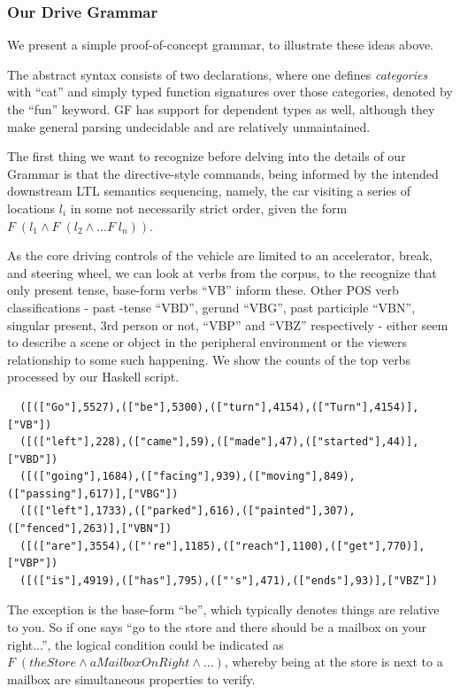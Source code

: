 \documentclass{article}
\begin{document}
\subsubsection{Our Drive Grammar}

We present a simple proof-of-concept grammar, to illustrate these ideas above.

The abstract syntax consists of two declarations, where one defines
\emph{categories} with ``cat'' and simply typed function signatures over those
categories, denoted by the ``fun'' keyword. GF has support for dependent types
as well, although they make general parsing undecidable and are relatively
unmaintained.

The first thing we want to recognize before delving into the details of our
Grammar is that the directive-style commands, being informed by the intended
downstream LTL semantics sequencing, namely, the car visiting a series of
locations $l_i$ in some not necessarily strict order, given the form $F\; (l_1
\wedge F\; (l_{2} \wedge ... F\; l_{n}))$.

As the core driving controls of the vehicle are limited to an accelerator,
break, and steering wheel, we can look at verbs from the corpus, to the
recognize that only present tense, base-form verbs ``VB'' inform these. Other
POS verb classifications - past -tense ``VBD'', gerund ``VBG'', past participle
``VBN'', singular present, 3rd person or not, ``VBP'' and ``VBZ'' respectively -
either seem to describe a scene or object in the peripheral environment or the viewers
relationship to some such happening. We show the counts of the top verbs
processed by our Haskell script.


\begin{verbatim}
  ([(["Go"],5527),(["be"],5300),(["turn"],4154),(["Turn"],4154)],["VB"])
  ([(["left"],228),(["came"],59),(["made"],47),(["started"],44)],["VBD"])
  ([(["going"],1684),(["facing"],939),(["moving"],849),(["passing"],617)],["VBG"])
  ([(["left"],1733),(["parked"],616),(["painted"],307),(["fenced"],263)],["VBN"])
  ([(["are"],3554),(["'re"],1185),(["reach"],1100),(["get"],770)],["VBP"])
  ([(["is"],4919),(["has"],795),(["'s"],471),(["ends"],93)],["VBZ"])
\end{verbatim}

The exception is the base-form ``be'', which
typically denotes things are relative to you. So if one says ``go to the store
and there should be a mailbox on your right...'', the logical condition could be
indicated as $F\; (theStore \wedge aMailboxOnRight \wedge ...)$, whereby being
at the store is next to a mailbox are simultaneous properties to verify.
\end{document}
